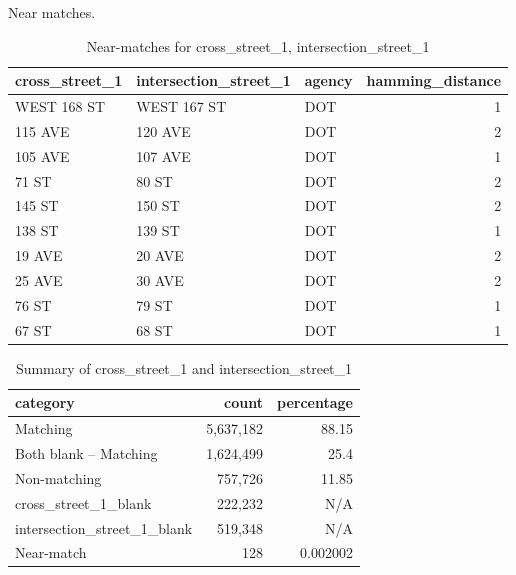 \documentclass[12pt, titlepage]{article}
\begin{document}
Near matches.

\begin{table}[H]
    \centering
    \footnotesize
    \begin{tabular}{l l l r}
        \toprule
        \textbf{cross\_street\_1} & \textbf{intersection\_street\_1} & \textbf{agency} & \textbf{hamming\_distance} \\
        \midrule
        WEST 168 ST    & WEST 167 ST           & DOT    & 1 \\
        115 AVE        & 120 AVE               & DOT    & 2 \\
        105 AVE        & 107 AVE               & DOT    & 1 \\
        71 ST          & 80 ST                 & DOT    & 2 \\
        145 ST         & 150 ST                & DOT    & 2 \\
        138 ST         & 139 ST                & DOT    & 1 \\
        19 AVE         & 20 AVE                & DOT    & 2 \\
        25 AVE         & 30 AVE                & DOT    & 2 \\
        76 ST          & 79 ST                 & DOT    & 1 \\
        67 ST          & 68 ST                 & DOT    & 1 \\
        \bottomrule
    \end{tabular}
    \caption{Near-matches for cross\_street\_1, intersection\_street\_1}
    \label{tab:x1nearmatches}
\end{table}

\begin{table}[H]
    \centering
    \footnotesize
    \begin{tabular}{l r r}
        \toprule
        \textbf{category} & \textbf{count} & \textbf{percentage} \\
        \midrule
        Matching                    & 5,637,182 & 88.15     \\
        Both blank -- Matching      & 1,624,499 & 25.4      \\
        Non-matching                &   757,726 & 11.85     \\
        cross\_street\_1\_blank     &   222,232 & N/A       \\
        intersection\_street\_1\_blank &   519,348 & N/A       \\
        Near-match                  &       128 & 0.002002  \\
        \bottomrule
    \end{tabular}
    \caption{Summary of cross\_street\_1 and intersection\_street\_1}
    \label{tab:summary1}
\end{table}
\end{document}
